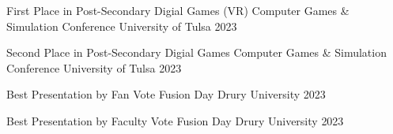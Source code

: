 



\begin{cvhonors}

  \cvhonor
    {First Place in Post-Secondary Digial Games (VR)} %
    {Computer Games \& Simulation Conference} %
    {University of Tulsa} %
    {2023} %

  \cvhonor
    {Second Place in Post-Secondary Digial Games} %
    {Computer Games \& Simulation Conference} %
    {University of Tulsa} %
    {2023} %

  \cvhonor
    {Best Presentation by Fan Vote} %
    {Fusion Day} %
    {Drury University} %
    {2023} %

  \cvhonor
    {Best Presentation by Faculty Vote} %
    {Fusion Day} %
    {Drury University} %
    {2023} %


\end{cvhonors}
